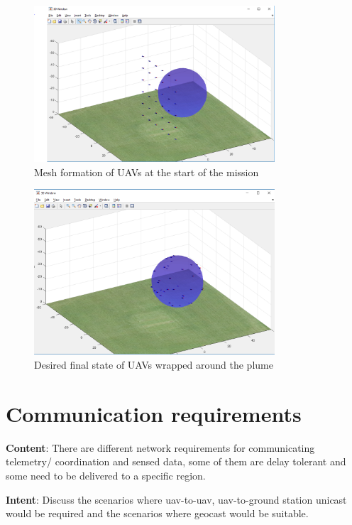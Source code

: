 \begin{figure}[hbtp]
\centering
\includegraphics[width=0.8\textwidth]{Chapter-3/figs/initial_drone_config}
\caption{Mesh formation of UAVs at the start of the mission}
\label{fig:mesh_formation}
\end{figure}

\begin{figure}[hbtp]
\centering
\includegraphics[width=0.8\textwidth]{Chapter-3/figs/final_formation}
\caption{Desired final state of UAVs wrapped around the plume}
\label{fig:final_state}
\end{figure}


\section{Communication requirements} \label{comm_reqs}
\textbf{Content}: There are different network requirements for communicating telemetry/ coordination and sensed data, some of them are delay tolerant and some need to be delivered to a specific region.

\textbf{Intent}: Discuss the scenarios where uav-to-uav, uav-to-ground station unicast would be required and the scenarios where geocast would be suitable. 

